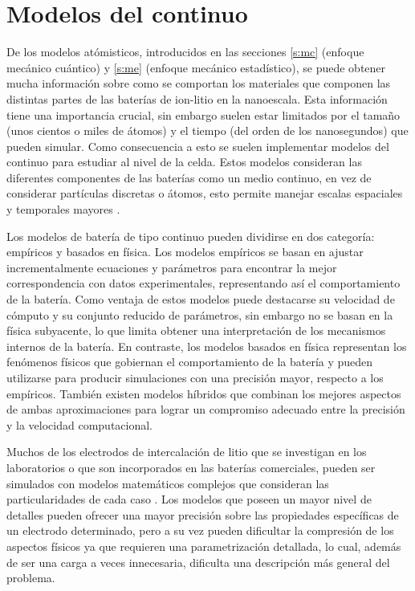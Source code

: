 \section{Modelos del continuo}

De los modelos atómisticos, introducidos en las secciones \ref{s:mc} (enfoque 
mecánico cuántico) y \ref{s:me} (enfoque mecánico estadístico), se puede obtener
mucha información sobre como se comportan los materiales que componen las
distintas partes de las baterías de ion-litio en la nanoescala. Esta información 
tiene una importancia crucial, sin embargo suelen estar limitados por el tamaño
(unos cientos o miles de átomos) y el tiempo (del orden de los nanosegundos) que 
pueden simular. Como consecuencia a esto se suelen implementar modelos del 
continuo para estudiar al nivel de la celda. Estos modelos consideran las 
diferentes componentes de las baterías como un medio continuo, en vez de 
considerar partículas discretas o átomos, esto permite manejar escalas espaciales 
y temporales mayores \cite{brosa2022}.

Los modelos de batería de tipo continuo pueden dividirse en dos categoría:
empíricos y basados en física. Los modelos empíricos se basan en ajustar 
incrementalmente ecuaciones y parámetros para encontrar la mejor correspondencia
con datos experimentales, representando así el comportamiento de la batería. 
Como ventaja de estos modelos puede destacarse su velocidad de cómputo y su
conjunto reducido de parámetros, sin embargo no se basan en la física subyacente, 
lo que limita obtener una interpretación de los mecanismos internos de la batería.
En contraste, los modelos basados en física representan los fenómenos físicos 
que gobiernan el comportamiento de la batería y pueden utilizarse para producir 
simulaciones con una precisión mayor, respecto a los empíricos. También existen
modelos híbridos que combinan los mejores aspectos de ambas aproximaciones para 
lograr un compromiso adecuado entre la precisión y la velocidad computacional.

Muchos de los electrodos de intercalación de litio que se investigan en los 
laboratorios o que son incorporados en las baterías comerciales, pueden ser 
simulados con modelos matemáticos complejos que consideran las particularidades 
de cada caso \cite{doyle1995}. Los modelos que poseen un mayor nivel de detalles 
pueden ofrecer una mayor precisión sobre las propiedades 
específicas de un electrodo determinado, pero a su vez pueden dificultar la 
compresión de los aspectos físicos ya que requieren una parametrización detallada, 
lo cual, además de ser una carga a veces innecesaria, dificulta una descripción 
más general del problema. 


